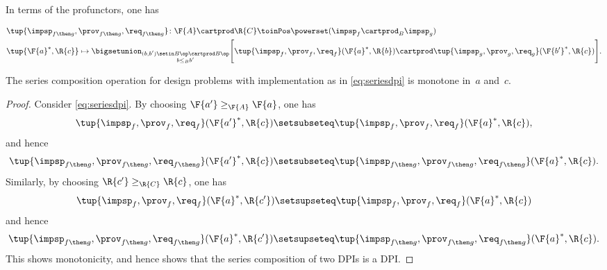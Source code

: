{\begin{definition}
        In terms of the profunctors, one has
        \begin{widepar}
            \begin{equation}
                \label{eq:seriesdpi}
                \begin{aligned}
                     & \tup{\impsp_{f\then g},\prov_{f\then g},\req_{f\then g}}\colon \F{A}\cartprod \R{C} \toinPos \powerset(\impsp_f \cartprod_B \impsp_g) \\
                     & \tup{\F{a}^*,\R{c}} \mapsto \bigsetunion_{\substack{(b,b') \setin B\op \cartprod B\op \\ b \leq_B b'}} \Bigg[ \tup{\impsp_f,\prov_f,\req_f}(\F{a}^*,\R{b}) \cartprod \tup{\impsp_g,\prov_g,\req_g}(\F{b'}^*,\R{c}) \Bigg].
                \end{aligned}
            \end{equation}
        \end{widepar}
    \end{definition}

    \begin{lemma}
        The series composition operation for design problems with implementation as in \cref{eq:seriesdpi} is monotone in~$a$ and~$c$.
    \end{lemma}
    \begin{proof}
        Consider \cref{eq:seriesdpi}.
        By choosing $\F{a'}\geq_\F{A} \F{a}$, one has
        \begin{equation}
            \tup{\impsp_{f},\prov_{f},\req_{f}}(\F{a'}^*,\R{c})\setsubseteq \tup{\impsp_{f},\prov_{f},\req_{f}}(\F{a}^*,\R{c}),
        \end{equation}
        and hence
        \begin{equation}
            \tup{\impsp_{f\then g},\prov_{f\then g},\req_{f\then g}}(\F{a'}^*,\R{c})\setsubseteq \tup{\impsp_{f\then g},\prov_{f\then g},\req_{f\then g}}(\F{a}^*,\R{c}).
        \end{equation}
        Similarly, by choosing $\R{c'}\geq_{\R{C}} \R{c}$, one has
        \begin{equation}
            \tup{\impsp_{f},\prov_{f},\req_{f}}(\F{a}^*,\R{c'})\setsupseteq \tup{\impsp_{f},\prov_{f},\req_{f}}(\F{a}^*,\R{c})
        \end{equation}
        and hence
        \begin{equation}
            \tup{\impsp_{f\then g},\prov_{f\then g},\req_{f\then g}}(\F{a}^*,\R{c'})\setsupseteq \tup{\impsp_{f\then g},\prov_{f\then g},\req_{f\then g}}(\F{a}^*,\R{c}).
        \end{equation}
        This shows monotonicity, and hence shows that the series composition of two DPIs is a DPI.
    \end{proof}

}
